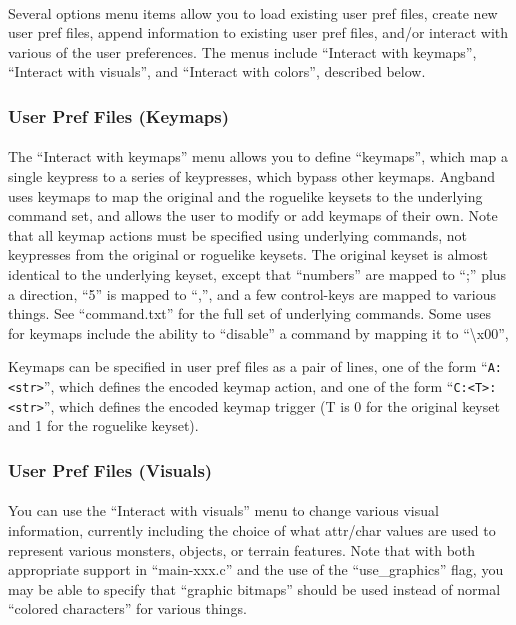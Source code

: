 \paragraph{}Several options menu items allow you to load existing user
pref files, create new user pref files, append information to 
existing user pref files, and/or interact with various of the user
preferences. The menus include ``Interact with keymaps'', ``Interact
with visuals'', and ``Interact with colors'', described below.

\subsubsection{User Pref Files (Keymaps)} 
\paragraph{}
The ``Interact with keymaps'' menu allows you to define ``keymaps'', which
map a single keypress to a series of keypresses, which bypass other
keymaps.  Angband uses keymaps to map the original and the roguelike
keysets to the underlying command set, and allows the user to modify or
add keymaps of their own.  Note that all keymap actions must be specified
using underlying commands, not keypresses from the original or roguelike
keysets.  The original keyset is almost identical to the underlying
keyset, except that ``numbers'' are mapped to ``;'' plus a direction,
``5'' is mapped to ``,'', and a few control-keys are mapped to various
things.  See ``command.txt'' for the full set of underlying commands.
Some uses for keymaps include the ability to ``disable'' a command by
mapping it to ``\textbackslash x00'',

Keymaps can be specified in user pref files as a pair of lines, one of the
form ``\verb+A:<str>+'', which defines the encoded keymap action, and one
of the form ``\verb+C:<T>:<str>+'', which defines the encoded keymap
trigger (T is 0 for the original keyset and 1 for the roguelike keyset).

\subsubsection{User Pref Files (Visuals)}
\paragraph{}You can use the ``Interact with visuals'' menu to change
various visual information, currently including the choice of what
attr/char values are used to represent various monsters, objects, or
terrain features. Note that with both appropriate support in
``main-xxx.c'' and the use of the ``use\_graphics'' flag, you may
be able to specify that ``graphic bitmaps'' should be used instead of
normal ``colored characters'' for various things.

